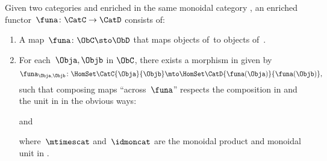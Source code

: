 \begin{ctdefinition}
    \label{def:enrichedfunctor}
    Given two categories \CatC and \CatD enriched in the same monoidal category \CatV, an enriched functor~$\funa\colon \CatC \to \CatD$ consists of:
    \begin{enumerate}
        \item A map~$\funa\colon \ObC \sto \ObD$ that maps objects of~\CatC to objects of~\CatD.
        \item For each~$\Obja, \Objb$ in $\ObC$, there exists a morphism in \CatV given by
              \begin{equation*}
                  \funa_{\Obja, \Objb} \colon \HomSet\CatC{\Obja}{\Objb} \mto \HomSet\CatD{\funa(\Obja)}{\funa(\Objb)},
              \end{equation*}
              such that composing maps ``across~$\funa$'' respects the composition in \CatC and the unit in \CatV in the obvious ways:
              \begin{center}
              \end{center}
              and
              \begin{center}
              \end{center}
              where~$\mtimescat$ and~$\idmoncat$ are the monoidal product and monoidal unit in \CatV.
    \end{enumerate}
\end{ctdefinition}


